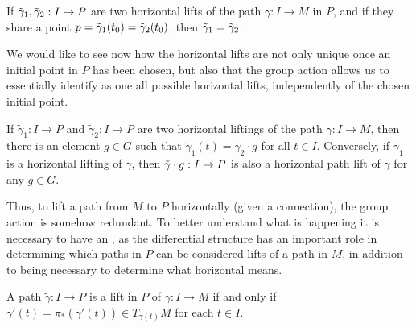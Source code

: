 \begin{proposition} 
If $\Tilde{\gamma}_1, \Tilde{\gamma}_2:I \to P$ are two horizontal lifts of the path $\gamma:I \to M$ in $P$, and if they share a point $p = \Tilde{\gamma}_1(t_0) = \Tilde{\gamma}_2(t_0)$, then $\Tilde{\gamma}_1 = \Tilde{\gamma}_2$. 
\end{proposition}


We would like to see now how the horizontal lifts are not only unique once an initial point in $P$ has been chosen, but also that the group action allows us to essentially identify as one all possible horizontal lifts, independently of the chosen initial point.

\begin{theorem}\label{thm:pathRed}
If $\tilde{\gamma}_1: I \to P$ and $\tilde{\gamma}_2: I \to P$ are two horizontal liftings of the path $\gamma:I \to M$, then there is an element $g \in G$ such that $\tilde{\gamma}_1 (t) = \tilde{\gamma}_2 \cdot g$ for all $t \in I$. Conversely, if $\tilde{\gamma}_1$ is a horizontal lifting of $\gamma$, then $\Tilde{\gamma}\cdot g :I \to P$ is also a horizontal path lift of $\gamma$ for any $g\in G$.
\end{theorem}

Thus, to lift a path from $M$ to $P$ horizontally (given a connection), the group action is somehow redundant. To better understand what is happening it is necessary to have an , as the differential structure has an important role in determining which paths in $P$ can be considered lifts of a path in $M$, in addition to being necessary to determine what horizontal means. 


\begin{proposition}
A path $\tilde{\gamma}:I \to P$ is a lift in $P$ of $\gamma:I \to M$ if and only if $\gamma'(t) = \pi_*(\tilde{\gamma}'(t)) \in T_{\gamma(t)}M$ for each $t \in I$.
\end{proposition}

